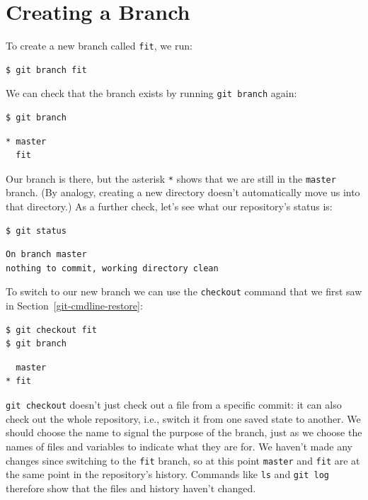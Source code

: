 \documentclass[
]{krantz}
\begin{document}
\hypertarget{git-advanced-branch-how}{%
\section{Creating a Branch}\label{git-advanced-branch-how}}

To create a new branch called \texttt{fit},
we run:

\begin{verbatim}
$ git branch fit
\end{verbatim}

We can check that the branch exists by running \texttt{git\ branch} again:

\begin{verbatim}
$ git branch
\end{verbatim}

\begin{verbatim}
* master
  fit
\end{verbatim}

Our branch is there,
but the asterisk \texttt{*} shows that we are still in the \texttt{master} branch.
(By analogy,
creating a new directory doesn't automatically move us into that directory.)
As a further check,
let's see what our repository's status is:

\begin{verbatim}
$ git status
\end{verbatim}

\begin{verbatim}
On branch master
nothing to commit, working directory clean
\end{verbatim}

To switch to our new branch we can use the \texttt{checkout} command
that we first saw in Section~\ref{git-cmdline-restore}:

\begin{verbatim}
$ git checkout fit
$ git branch
\end{verbatim}

\begin{verbatim}
  master
* fit
\end{verbatim}

\texttt{git\ checkout} doesn't just check out a file from a specific commit:
it can also check out the whole repository,
i.e.,
switch it from one saved state to another.
We should choose the name to signal the purpose of the branch,
just as we choose the names of files and variables to indicate what they are for.
We haven't made any changes since switching to the \texttt{fit} branch,
so at this point \texttt{master} and \texttt{fit} are at the same point in the repository's history.
Commands like \texttt{ls} and \texttt{git\ log} therefore show that the files and history haven't changed.
\end{document}
